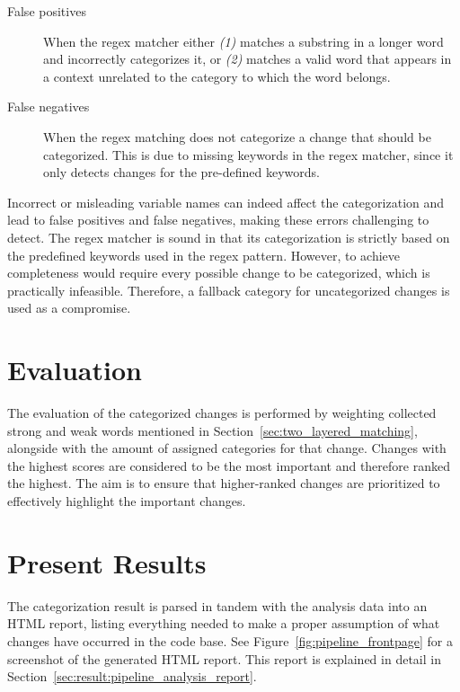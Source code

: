 \begin{description}
    \item[False positives] When the regex matcher either \textit{(1)} matches a substring in a longer word and incorrectly categorizes it, or \textit{(2)} matches a valid word that appears in a context unrelated to the category to which the word belongs.

    \item[False negatives] When the regex matching does not categorize a change that should be categorized. This is due to missing keywords in the regex matcher, since it only detects changes for the pre-defined keywords.
\end{description} 


Incorrect or misleading variable names can indeed affect the categorization and lead to false positives and false negatives, making these errors challenging to detect. The regex matcher is sound in that its categorization is strictly based on the predefined keywords used in the regex pattern. However, to achieve completeness would require every possible change to be categorized, which is practically infeasible. Therefore, a fallback category for uncategorized changes is used as a compromise.

\section{Evaluation}
The evaluation of the categorized changes is performed by weighting collected strong and weak words mentioned in Section~\ref{sec:two_layered_matching}, alongside with the amount of assigned categories for that change. Changes with the highest scores are considered to be the most important and therefore ranked the highest. The aim is to ensure that higher-ranked changes are prioritized to effectively highlight the important changes.


\section{Present Results}
The categorization result is parsed in tandem with the analysis data into an HTML report, listing everything needed to make a proper assumption of what changes have occurred in the code base. See Figure~\ref{fig:pipeline_frontpage} for a screenshot of the generated HTML report. This report is explained in detail in Section~\ref{sec:result:pipeline_analysis_report}.


